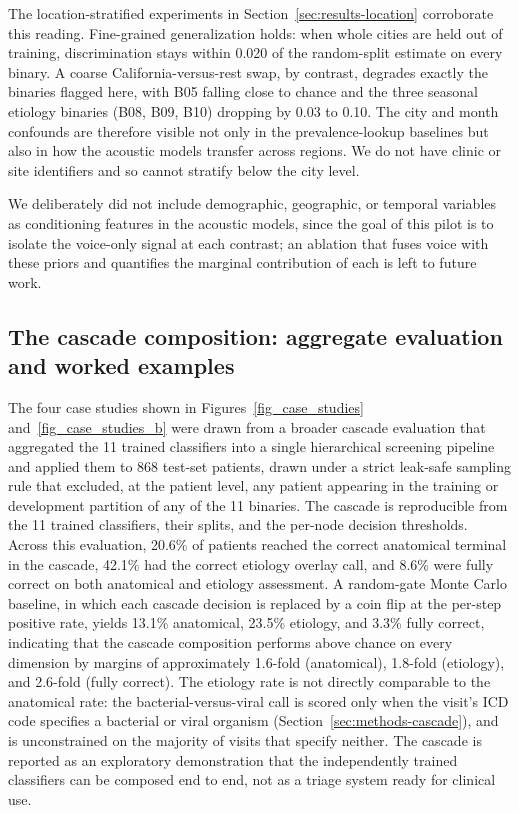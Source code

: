 \documentclass[utf8]{FrontiersinHarvard} %
\begin{document}
The location-stratified experiments in Section~\ref{sec:results-location} corroborate this reading. Fine-grained generalization holds: when whole cities are held out of training, discrimination stays within 0.020 of the random-split estimate on every binary. A coarse California-versus-rest swap, by contrast, degrades exactly the binaries flagged here, with B05 falling close to chance and the three seasonal etiology binaries (B08, B09, B10) dropping by 0.03 to 0.10. The city and month confounds are therefore visible not only in the prevalence-lookup baselines but also in how the acoustic models transfer across regions. We do not have clinic or site identifiers and so cannot stratify below the city level.

We deliberately did not include demographic, geographic, or temporal variables as conditioning features in the acoustic models, since the goal of this pilot is to isolate the voice-only signal at each contrast; an ablation that fuses voice with these priors and quantifies the marginal contribution of each is left to future work.

\subsection{The cascade composition: aggregate evaluation and worked examples}
\label{sec:discussion-cascade}

The four case studies shown in Figures~\ref{fig_case_studies} and~\ref{fig_case_studies_b} were drawn from a broader cascade evaluation that aggregated the 11 trained classifiers into a single hierarchical screening pipeline and applied them to 868 test-set patients, drawn under a strict leak-safe sampling rule that excluded, at the patient level, any patient appearing in the training or development partition of any of the 11 binaries. The cascade is reproducible from the 11 trained classifiers, their splits, and the per-node decision thresholds. Across this evaluation, 20.6\% of patients reached the correct anatomical terminal in the cascade, 42.1\% had the correct etiology overlay call, and 8.6\% were fully correct on both anatomical and etiology assessment. A random-gate Monte Carlo baseline, in which each cascade decision is replaced by a coin flip at the per-step positive rate, yields 13.1\% anatomical, 23.5\% etiology, and 3.3\% fully correct, indicating that the cascade composition performs above chance on every dimension by margins of approximately 1.6-fold (anatomical), 1.8-fold (etiology), and 2.6-fold (fully correct). The etiology rate is not directly comparable to the anatomical rate: the bacterial-versus-viral call is scored only when the visit's ICD code specifies a bacterial or viral organism (Section~\ref{sec:methods-cascade}), and is unconstrained on the majority of visits that specify neither. The cascade is reported as an exploratory demonstration that the independently trained classifiers can be composed end to end, not as a triage system ready for clinical use.
\end{document}
